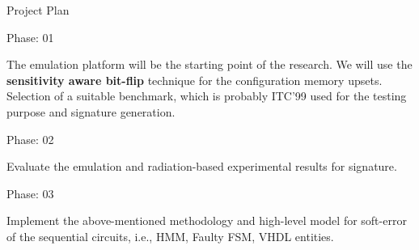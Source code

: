 \documentclass[aspectratio=1610]{beamer}
\begin{document}
\begin{frame}{Project Plan}



\begin{block}{Phase: 01}
\end{block}
The emulation platform will be the starting point of the research. We will use the \textbf{sensitivity aware bit-flip} technique for the configuration memory upsets. Selection of a suitable benchmark, which is probably ITC'99 used for the testing purpose and signature generation.





\begin{block}{Phase: 02}

\end{block}
Evaluate the emulation and radiation-based experimental results for signature.


\begin{block}{Phase: 03}
\end{block}
Implement the above-mentioned methodology and high-level model for soft-error of the sequential circuits, i.e., HMM, Faulty FSM, VHDL entities.





\end{frame}
\end{document}
